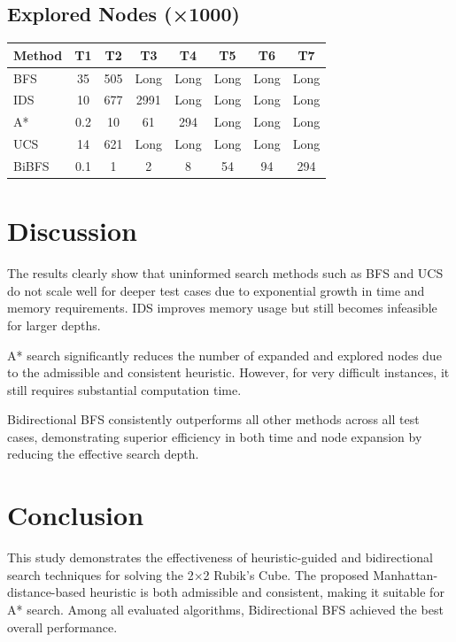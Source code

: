 \documentclass[12pt]{article}
\begin{document}
\subsection{Explored Nodes (×1000)}
\begin{longtable}{lccccccc}
\toprule
Method & T1 & T2 & T3 & T4 & T5 & T6 & T7 \\
\midrule
BFS   & 35 & 505 & Long & Long & Long & Long & Long \\
IDS   & 10 & 677 & 2991 & Long & Long & Long & Long \\
A*    & 0.2 & 10 & 61 & 294 & Long & Long & Long \\
UCS   & 14 & 621 & Long & Long & Long & Long & Long \\
BiBFS & 0.1 & 1 & 2 & 8 & 54 & 94 & 294 \\
\bottomrule
\end{longtable}

\section{Discussion}
The results clearly show that uninformed search methods such as BFS and UCS do not scale well for deeper test cases due to exponential growth in time and memory requirements. IDS improves memory usage but still becomes infeasible for larger depths.

A* search significantly reduces the number of expanded and explored nodes due to the admissible and consistent heuristic. However, for very difficult instances, it still requires substantial computation time.

Bidirectional BFS consistently outperforms all other methods across all test cases, demonstrating superior efficiency in both time and node expansion by reducing the effective search depth.

\section{Conclusion}
This study demonstrates the effectiveness of heuristic-guided and bidirectional search techniques for solving the 2×2 Rubik’s Cube. The proposed Manhattan-distance-based heuristic is both admissible and consistent, making it suitable for A* search. Among all evaluated algorithms, Bidirectional BFS achieved the best overall performance.
\end{document}
